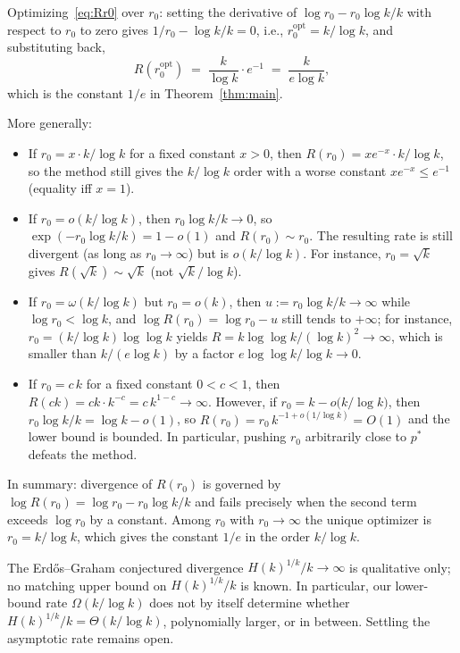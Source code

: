 \documentclass[11pt,reqno,a4paper]{amsart}
\theoremstyle{plain}
\theoremstyle{definition}
\theoremstyle{remark}
\numberwithin{equation}{section}
\begin{document}
Optimizing~\eqref{eq:Rr0} over $r_{0}$: setting the derivative of
$\log r_{0}-r_{0}\log k/k$ with respect to $r_{0}$ to zero gives
$1/r_{0}-\log k/k=0$, i.e., $r_{0}^{\mathrm{opt}}=k/\log k$, and
substituting back,
\[
R(r_{0}^{\mathrm{opt}})\;=\;\frac{k}{\log k}\cdot e^{-1}\;=\;\frac{k}{e\log k},
\]
which is the constant $1/e$ in Theorem~\ref{thm:main}.

\medskip
More generally:

\begin{itemize}
\item If $r_{0}=x\cdot k/\log k$ for a fixed constant $x>0$, then
  $R(r_{0})=xe^{-x}\cdot k/\log k$, so the method still gives the
  $k/\log k$ order with a worse constant $xe^{-x}\le e^{-1}$
  (equality iff $x=1$).
\item If $r_{0}=o(k/\log k)$, then $r_{0}\log k/k\to 0$, so
  $\exp(-r_{0}\log k/k)=1-o(1)$ and $R(r_{0})\sim r_{0}$. The
  resulting rate is still divergent (as long as $r_{0}\to\infty$)
  but is $o(k/\log k)$. For instance, $r_{0}=\sqrt{k}$ gives
  $R(\sqrt{k})\sim\sqrt{k}$ (not $\sqrt{k}/\log k$).
\item If $r_{0}=\omega(k/\log k)$ but $r_{0}=o(k)$, then
  $u:=r_{0}\log k/k\to\infty$ while $\log r_{0}<\log k$, and
  $\log R(r_{0})=\log r_{0}-u$ still tends to $+\infty$; for
  instance, $r_{0}=(k/\log k)\log\log k$ yields
  $R=k\log\log k/(\log k)^{2}\to\infty$, which is smaller than
  $k/(e\log k)$ by a factor $e\log\log k/\log k\to 0$.
\item If $r_{0}=c\,k$ for a fixed constant $0<c<1$, then
  $R(c k)=c k\cdot k^{-c}=c\,k^{1-c}\to\infty$. However, if
  $r_{0}=k-o\bigl(k/\log k\bigr)$, then
  $r_{0}\log k/k=\log k-o(1)$, so
  $R(r_{0})=r_{0}\,k^{-1+o(1/\log k)}=O(1)$ and the lower bound is
  bounded. In particular, pushing $r_{0}$ arbitrarily close to $p^{*}$
  defeats the method.
\end{itemize}
In summary: divergence of $R(r_{0})$ is governed by
$\log R(r_{0})=\log r_{0}-r_{0}\log k/k$ and fails precisely when the
second term exceeds $\log r_{0}$ by a constant. Among $r_{0}$ with
$r_{0}\to\infty$ the unique optimizer is $r_{0}=k/\log k$, which gives
the constant $1/e$ in the order $k/\log k$.

\medskip
The Erd\H{o}s--Graham conjectured divergence
$H(k)^{1/k}/k\to\infty$ is qualitative only; no matching upper bound
on $H(k)^{1/k}/k$ is known. In particular, our lower-bound rate
$\Omega(k/\log k)$ does not by itself determine whether
$H(k)^{1/k}/k=\Theta(k/\log k)$, polynomially larger, or in between.
Settling the asymptotic rate remains open.
\end{document}
